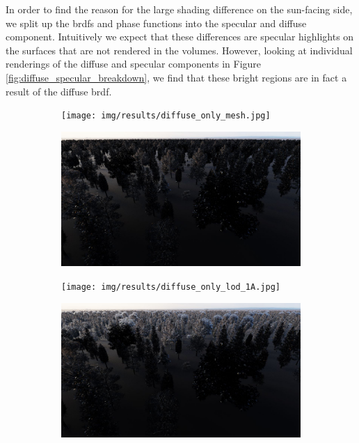 In order to find the reason for the large shading difference on the sun-facing side, we split up the \acsp{brdf} and phase functions into the specular and diffuse component.
Intuitively we expect that these differences are specular highlights on the surfaces that are not rendered in the volumes.
However, looking at individual renderings of the diffuse and specular components in Figure \ref{fig:diffuse_specular_breakdown}, we find that these bright regions are in fact a result of the diffuse \ac{brdf}.
\begin{figure}[t]
    \centering
    \begin{subfigure}[b]{0.49\linewidth}
        \centering
        \texttt{[image: img/results/diffuse\_only\_mesh.jpg]}
        \caption{}
    \end{subfigure}
    \begin{subfigure}[b]{0.49\linewidth}
        \centering
        \includegraphics[width=1\linewidth]{img/results/specular_only_mesh.jpg}
        \caption{}
    \end{subfigure}
    \begin{subfigure}[b]{0.49\linewidth}
        \centering
        \texttt{[image: img/results/diffuse\_only\_lod\_1A.jpg]}
        \caption{}
    \end{subfigure}
    \begin{subfigure}[b]{0.49\linewidth}
        \centering
        \includegraphics[width=1\linewidth]{img/results/specular_only_lod_1A.jpg}

\end{subfigure}
\end{figure}
